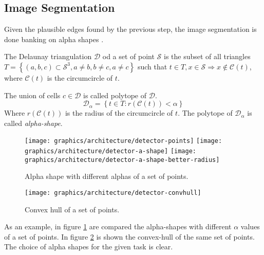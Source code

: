     \subsection{Image Segmentation}\label{subsection:segmentation}
        \par{
            Given the plausible edges found by the previous step, the image segmentation is done banking on alpha shapes \cite{springer:10.1007/11907350_46}.
        }
        \par{
            The Delaunay triangulation $\mathcal{D}$ od a set of point $\mathcal{S}$ is the subset of all triangles $T = \left\{\left(a, b, c\right) \subset \mathcal{S}^3, a \neq b, b \neq c, a \neq c \right\}$ such that $t \in T, x \in \mathcal{S} \Rightarrow x \not\in \mathcal{C}\left(t\right)$, where $\mathcal{C}\left(t\right)$ is the circumcircle of $t$.
        }
        \par{
            The union of cells $c \in \mathcal{D}$ is called polytope of $\mathcal{D}$. 
            \begin{equation*}
                \mathcal{D}_\alpha = \left\{t \in T \colon r\left(\mathcal{C}\left(t\right)\right) < \alpha\right\}
            \end{equation*}
            Where $r\left(\mathcal{C}\left(t\right)\right)$ is the radius of the circumcircle of $t$. The polytope of $\mathcal{D}_\alpha$ is called \emph{alpha-shape}.
        }
        \begin{figure}
            \centering
            \texttt{[image: graphics/architecture/detector-points]}
            \texttt{[image: graphics/architecture/detector-a-shape]}
            \texttt{[image: graphics/architecture/detector-a-shape-better-radius]}
            \caption{Alpha shape with different alphas of a set of points.}\label{fig:example-alpha-shape}
        \end{figure}
        \begin{figure}
            \centering
            \texttt{[image: graphics/architecture/detector-convhull]}
            \caption{Convex hull of a set of points.}\label{fig:example-convex-hull}
        \end{figure}
        \par{
            As an example, in figure \ref{fig:example-alpha-shape} are compared the alpha-shapes with different $\alpha$ values of a set of points. In figure \ref{fig:example-convex-hull} is shown the convex-hull of the same set of points. The choice of alpha shapes for the given task is clear.
        }
